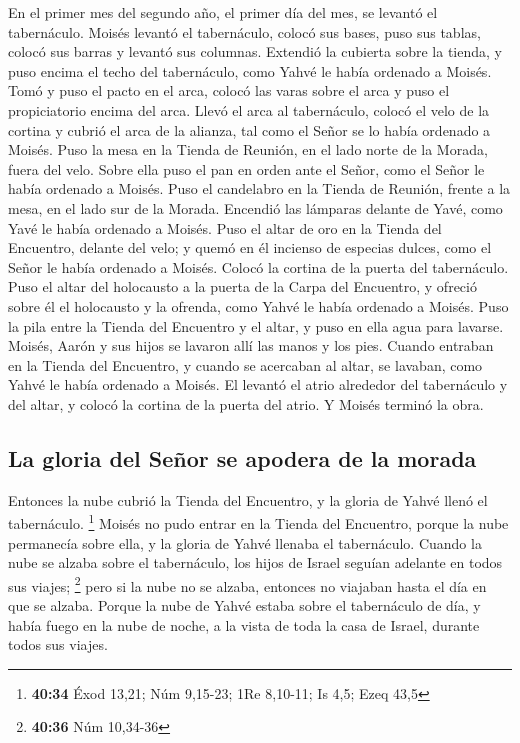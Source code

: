 \begin{paracol}{2}
 En el primer mes del segundo año, el primer día del mes,
se levantó el tabernáculo.  Moisés levantó el
tabernáculo, colocó sus bases, puso sus tablas, colocó sus barras y
levantó sus columnas.  Extendió la cubierta sobre la
tienda, y puso encima el techo del tabernáculo, como Yahvé le había
ordenado a Moisés.  Tomó y puso el pacto en el arca,
colocó las varas sobre el arca y puso el propiciatorio encima del arca.
 Llevó el arca al tabernáculo, colocó el velo de la
cortina y cubrió el arca de la alianza, tal como el Señor se lo había
ordenado a Moisés.  Puso la mesa en la Tienda de Reunión,
en el lado norte de la Morada, fuera del velo.  Sobre
ella puso el pan en orden ante el Señor, como el Señor le había ordenado
a Moisés.  Puso el candelabro en la Tienda de Reunión,
frente a la mesa, en el lado sur de la Morada.  Encendió
las lámparas delante de Yavé, como Yavé le había ordenado a Moisés.
 Puso el altar de oro en la Tienda del Encuentro, delante
del velo;  y quemó en él incienso de especias dulces,
como el Señor le había ordenado a Moisés.  Colocó la
cortina de la puerta del tabernáculo.  Puso el altar del
holocausto a la puerta de la Carpa del Encuentro, y ofreció sobre él el
holocausto y la ofrenda, como Yahvé le había ordenado a Moisés.
 Puso la pila entre la Tienda del Encuentro y el altar, y
puso en ella agua para lavarse.  Moisés, Aarón y sus
hijos se lavaron allí las manos y los pies.  Cuando
entraban en la Tienda del Encuentro, y cuando se acercaban al altar, se
lavaban, como Yahvé le había ordenado a Moisés.  El
levantó el atrio alrededor del tabernáculo y del altar, y colocó la
cortina de la puerta del atrio. Y Moisés terminó la obra.

\hypertarget{la-gloria-del-seuxf1or-se-apodera-de-la-morada}{%
\subsection{La gloria del Señor se apodera de la
morada}\label{la-gloria-del-seuxf1or-se-apodera-de-la-morada}}

 Entonces la nube cubrió la Tienda del Encuentro, y la
gloria de Yahvé llenó el tabernáculo. \footnote{\textbf{40:34} Éxod
  13,21; Núm 9,15-23; 1Re 8,10-11; Is 4,5; Ezeq 43,5} 
Moisés no pudo entrar en la Tienda del Encuentro, porque la nube
permanecía sobre ella, y la gloria de Yahvé llenaba el tabernáculo.
 Cuando la nube se alzaba sobre el tabernáculo, los hijos
de Israel seguían adelante en todos sus viajes; \footnote{\textbf{40:36}
  Núm 10,34-36}  pero si la nube no se alzaba, entonces
no viajaban hasta el día en que se alzaba.  Porque la
nube de Yahvé estaba sobre el tabernáculo de día, y había fuego en la
nube de noche, a la vista de toda la casa de Israel, durante todos sus
viajes. \switchcolumn \begin{otherlanguage}{english}


\end{otherlanguage}
\end{paracol}
